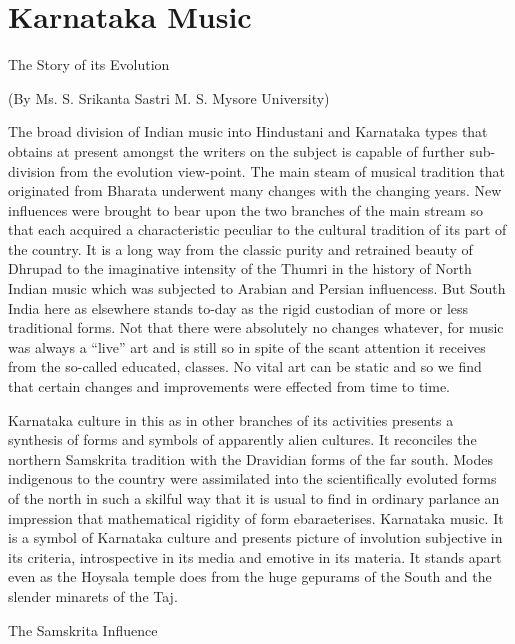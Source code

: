 \documentclass{book}
\begin{document}
\chapter*{Karnataka Music}

\begin{center}
The Story of its Evolution
\end{center}

(By Ms. S. Srikanta Sastri M. S. Mysore University)


The broad division of Indian music into Hindustani and Karnataka types
that obtains at present amongst the writers on the subject is capable
of further sub-division from the evolution view-point. The main steam
of musical tradition that originated from Bharata underwent many
changes with the changing years. New influences were brought to bear
upon the two branches of the main stream so that each acquired a
characteristic peculiar to the cultural tradition of its part of the
country. It is a long way from the classic purity and retrained
beauty of Dhrupad to the imaginative intensity of the Thumri in the
history of North Indian music which was subjected to Arabian and
Persian influencess. But South India here as elsewhere stands to-day
as the rigid custodian of more or less traditional forms. Not that
there were absolutely no changes whatever, for music was always a
``live'' art and is still so in spite of the scant attention it
receives from the so-called educated, classes. No vital art can be
static and so we find that certain changes and improvements were
effected from time to time.

Karnataka culture in this as in other branches of its activities
presents a synthesis of forms and symbols of apparently alien
cultures. It reconciles the northern Samskrita tradition with the
Dravidian forms of the far south. Modes indigenous to the country were
assimilated into the scientifically evoluted forms of the north in
such a skilful way that it is usual to find in ordinary parlance an
impression that mathematical rigidity of form ebaraeterises.
Karnataka music. It is a symbol of Karnataka culture and  presents
picture of involution subjective in its criteria, introspective in its
media and emotive in its materia. It stands apart even as the Hoysala
temple does from the huge gepurams of the South and the slender
minarets of the Taj.

\begin{center}
The Samskrita Influence
\end{center}
\end{document}

